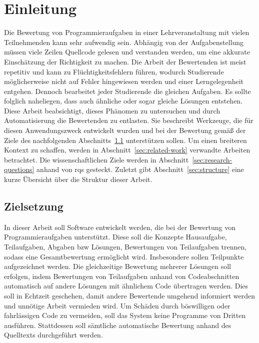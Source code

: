 \chapter{Einleitung}\label{ch:introduction}

Die Bewertung von Programmieraufgaben in einer Lehrveranstaltung mit vielen Teilnehmenden kann sehr aufwendig sein.
Abhängig von der Aufgabenstellung müssen viele Zeilen Quellcode gelesen und verstanden werden, um eine akkurate Einschätzung der Richtigkeit zu machen.
Die Arbeit der Bewertenden ist meist repetitiv und kann zu Flüchtigkeitsfehlern führen, wodurch Studierende möglicherweise nicht auf Fehler hingewiesen werden und einer Lerngelegenheit entgehen.
Dennoch bearbeitet jeder Studierende die gleichen Aufgaben.
Es sollte folglich naheliegen, dass auch ähnliche oder sogar gleiche Lösungen entstehen.
Diese Arbeit beabsichtigt, dieses Phänomen zu untersuchen und durch Automatisierung die Bewertenden zu entlasten.
Sie beschreibt Werkzeuge, die für diesen Anwendungszweck entwickelt wurden und bei der Bewertung gemäß der Ziele des nachfolgenden Abschnitts~\ref{sec:goals} unterstützen sollen.
Um einen breiteren Kontext zu schaffen, werden in Abschnitt~\ref{sec:related-work} verwandte Arbeiten betrachtet.
Die wissenschaftlichen Ziele werden in Abschnitt~\ref{sec:research-questions} anhand von \acp{rq} gesteckt.
Zuletzt gibt Abschnitt~\ref{sec:structure} eine kurze Übersicht über die Struktur dieser Arbeit.

\section{Zielsetzung}\label{sec:goals}

In dieser Arbeit soll Software entwickelt werden, die bei der Bewertung von Programmieraufgaben unterstützt.
Diese soll die Konzepte Hausaufgabe, Teilaufgaben, Abgaben \ac{bzw} Lösungen, Bewertungen von Teilaufgaben trennen, sodass eine Gesamtbewertung ermöglicht wird.
Insbesondere sollen Teilpunkte aufgezeichnet werden.
Die gleichzeitige Bewertung mehrerer Lösungen soll erfolgen, indem Bewertungen von Teilaufgaben anhand von Codeabschnitten automatisch auf andere Lösungen mit ähnlichem Code übertragen werden.
Dies soll in Echtzeit geschehen, damit andere Bewertende umgehend informiert werden und unnötige Arbeit vermieden wird.
Um Schäden durch böswilligen oder fahrlässigen Code zu vermeiden, soll das System keine Programme von Dritten ausführen.
Stattdessen soll sämtliche automatische Bewertung anhand des Quelltexts durchgeführt werden.


